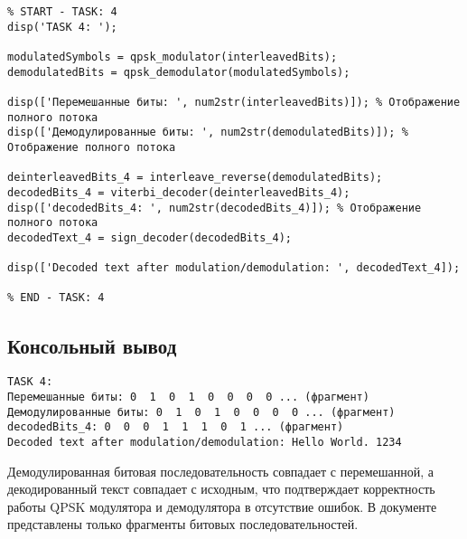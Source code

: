 \begin{verbatim}
% START - TASK: 4
disp('TASK 4: ');

modulatedSymbols = qpsk_modulator(interleavedBits);
demodulatedBits = qpsk_demodulator(modulatedSymbols);

disp(['Перемешанные биты: ', num2str(interleavedBits)]); % Отображение полного потока
disp(['Демодулированные биты: ', num2str(demodulatedBits)]); % Отображение полного потока

deinterleavedBits_4 = interleave_reverse(demodulatedBits);
decodedBits_4 = viterbi_decoder(deinterleavedBits_4);
disp(['decodedBits_4: ', num2str(decodedBits_4)]); % Отображение полного потока
decodedText_4 = sign_decoder(decodedBits_4);

disp(['Decoded text after modulation/demodulation: ', decodedText_4]);

% END - TASK: 4
\end{verbatim}

\subsection{Консольный вывод}
\begin{verbatim}
TASK 4:
Перемешанные биты: 0  1  0  1  0  0  0  0 ... (фрагмент)
Демодулированные биты: 0  1  0  1  0  0  0  0 ... (фрагмент)
decodedBits_4: 0  0  0  1  1  1  0  1 ... (фрагмент)
Decoded text after modulation/demodulation: Hello World. 1234
\end{verbatim}
Демодулированная битовая последовательность совпадает с перемешанной, а декодированный текст совпадает с исходным, что подтверждает корректность работы QPSK модулятора и демодулятора в отсутствие ошибок. В документе представлены только фрагменты битовых последовательностей.

